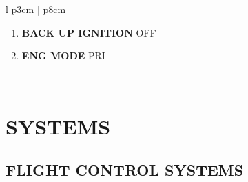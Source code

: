 \documentclass[fontHelvetica]{TechCheck}
\begin{document}
\begin{center}
\begin{longtable}{l p{3cm} | p{8cm}}
			\begin{minipage}[t]{\linewidth}
				\vspace{-7pt}
				\begin{enumerate}
					\item \textbf{BACK UP IGNITION} \dotfill OFF
					\item \textbf{ENG MODE} \dotfill PRI
				\end{enumerate}
			\end{minipage} \\
			\bottomrule
		\end{longtable}
	\end{center}

	\cleardoublepage

	\chapter{SYSTEMS}
	\minitoc
	\cleardoublepage

	\section{FLIGHT CONTROL SYSTEMS}
	\thumbnar
\end{document}
